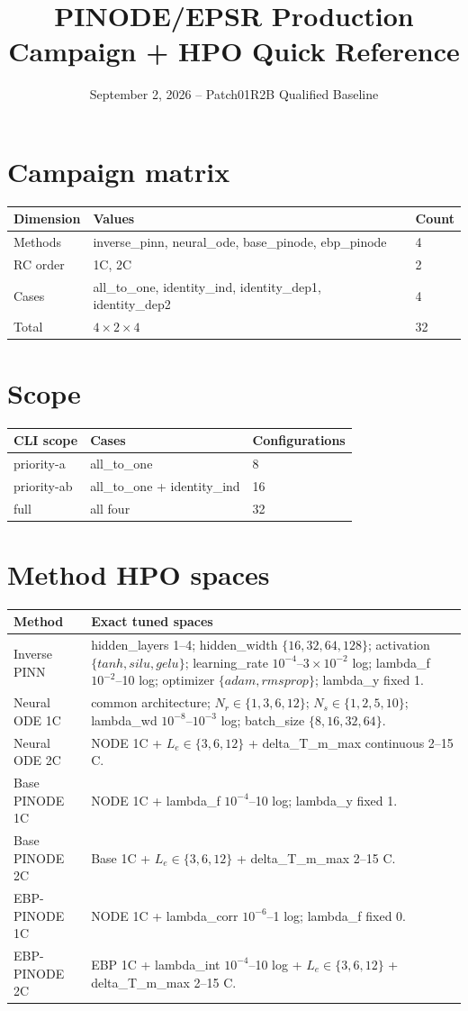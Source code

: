 \documentclass[10pt]{article}
\title{PINODE/EPSR Production Campaign + HPO Quick Reference}
\date{September 2, 2026 -- Patch01R2B Qualified Baseline}
\begin{document}
\maketitle

\section*{Campaign matrix}
\begin{tabularx}{\textwidth}{L{0.22\textwidth}YY}
\toprule
Dimension & Values & Count \\
\midrule
Methods & inverse\_pinn, neural\_ode, base\_pinode, ebp\_pinode & 4 \\
RC order & 1C, 2C & 2 \\
Cases & all\_to\_one, identity\_ind, identity\_dep1, identity\_dep2 & 4 \\
Total & $4\times2\times4$ & 32 \\
\bottomrule
\end{tabularx}

\section*{Scope}
\begin{tabular}{lll}
\toprule
CLI scope & Cases & Configurations \\
\midrule
priority-a & all\_to\_one & 8 \\
priority-ab & all\_to\_one + identity\_ind & 16 \\
full & all four & 32 \\
\bottomrule
\end{tabular}

\section*{Method HPO spaces}
\small
\begin{longtable}{L{0.20\textwidth}L{0.72\textwidth}}
\toprule
Method & Exact tuned spaces \\
\midrule
Inverse PINN & hidden\_layers 1--4; hidden\_width $\{16,32,64,128\}$; activation $\{tanh,silu,gelu\}$; learning\_rate $10^{-4}$--$3\times10^{-2}$ log; lambda\_f $10^{-2}$--10 log; optimizer $\{adam,rmsprop\}$; lambda\_y fixed 1. \\
Neural ODE 1C & common architecture; $N_r\in\{1,3,6,12\}$; $N_s\in\{1,2,5,10\}$; lambda\_wd $10^{-8}$--$10^{-3}$ log; batch\_size $\{8,16,32,64\}$. \\
Neural ODE 2C & NODE 1C + $L_e\in\{3,6,12\}$ + delta\_T\_m\_max continuous 2--15 C. \\
Base PINODE 1C & NODE 1C + lambda\_f $10^{-4}$--10 log; lambda\_y fixed 1. \\
Base PINODE 2C & Base 1C + $L_e\in\{3,6,12\}$ + delta\_T\_m\_max 2--15 C. \\
EBP-PINODE 1C & NODE 1C + lambda\_corr $10^{-6}$--1 log; lambda\_f fixed 0. \\
EBP-PINODE 2C & EBP 1C + lambda\_int $10^{-4}$--10 log + $L_e\in\{3,6,12\}$ + delta\_T\_m\_max 2--15 C. \\
\bottomrule
\end{longtable}
\normalsize
\end{document}
